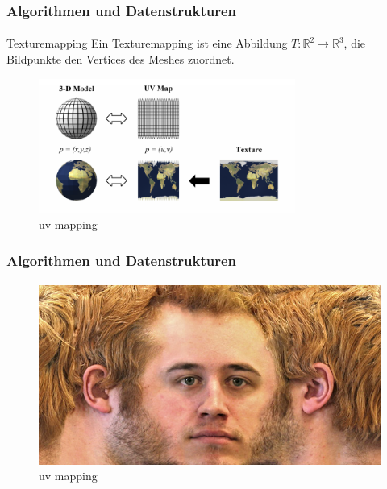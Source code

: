 \documentclass{beamer}
\begin{document}
\begin{frame}
    \frametitle{Algorithmen und Datenstrukturen}
\framesubtitle{}
    \begin{block}{Texturemapping}
    Ein Texturemapping ist eine Abbildung $T: \mathbb{R}^2 \to \mathbb{R}^3$, 
    die Bildpunkte den Vertices des Meshes zuordnet.
    \end{block}

\begin{figure}[H]
    \centering
    \includegraphics[width=0.75\textwidth]{images/tm_uv.png}
    \caption{uv mapping} %
    \label{fig:uv-mapping1}
\end{figure}
\end{frame}

\begin{frame}
    \frametitle{Algorithmen und Datenstrukturen}
\framesubtitle{}
\begin{figure}[H]
    \centering
    \includegraphics[width=1.0\textwidth]{images/tm_face.jpg}
    \caption{uv mapping} %
    \label{fig:uv-mapping2}
\end{figure}
\end{frame}
\end{document}
